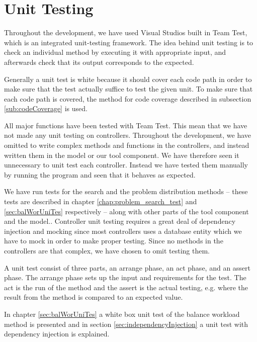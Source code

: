 \section{Unit Testing}
\label{chap:testing}
Throughout the development, we have used Visual Studios built in Team Test, which is an integrated unit-testing framework. \cite{teamtest} 
The idea behind unit testing is to check an individual method by executing it with appropriate input, and afterwards check that its output corresponds to the expected.

Generally a unit test is white because it should cover each code path in order to make sure that the test actually suffice to test the given unit. \cite[p.~39]{williams06}
To make sure that each code path is covered, the method for code coverage described in subsection \ref{sub:codeCoverage} is used.

All major functions have been tested with Team Test. This mean that we have not made any unit testing on controllers. 
Throughout the development, we have omitted to write complex methods and functions in the controllers, and instead written them in the model or our tool component. We have therefore seen it unnecessary to unit test each controller. Instead we have tested them manually by running the program and seen that it behaves as expected. 

We have run tests for the search and the problem distribution methods -- these tests are described in chapter \ref{chap:problem_search_test} and \ref{sec:balWorUniTes} respectively -- along with other parts of the tool component and the model.. 
Controller unit testing requires a great deal of dependency injection and mocking since most controllers uses a database entity which we have to mock in order to make proper testing.
Since no methods in the controllers are that complex, we have chosen to omit testing them.

A unit test consist of three parts, an arrange phase, an act phase, and an assert phase. 
The arrange phase sets up the input and requirements for the test. 
The act is the run of the method and the assert is the actual testing, e.g. where the result from the method is compared to an expected value.

In chapter \ref{sec:balWorUniTes} a white box unit test of the balance workload method is presented and in section \ref{sec:independencyInjection} a unit test with dependency injection is explained. 